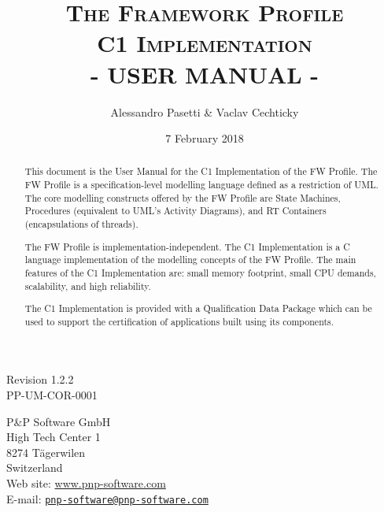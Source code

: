 \documentclass[a4paper,10pt]{article}
\title{\textsc{The Framework Profile} \\ \textsc{C1 Implementation} \\ \textsc{- USER MANUAL -}}
\author{Alessandro Pasetti \& Vaclav Cechticky}
\date{7 February 2018}
\begin{document}
\maketitle

\begin{center}
Revision 1.2.2 \\
PP-UM-COR-0001
\end{center}

\begin{center}
P\&P Software GmbH \\
High Tech Center 1 \\
8274 T\"{a}gerwilen \\
Switzerland \\
\vspace{2mm}
Web site: \url{www.pnp-software.com}\\
E-mail: \href{mailto:pnp-software@pnp-software.com}{\nolinkurl{pnp-software@pnp-software.com}} 
\end{center}

\begin{table}[ht]
\begin{center}
\begin{tabular}{p{11.7cm}}
\\
\hline
\end{tabular}
\end{center}
\end{table}
\begin{abstract}
This document is the User Manual for the C1 Implementation of the FW Profile. The FW Profile is a specification-level modelling language defined as a restriction of UML. The core modelling constructs offered by the FW Profile are State Machines, Procedures (equivalent to UML's Activity Diagrams), and RT Containers (encapsulations of threads).
\par
The FW Profile is implementation-independent. The C1 Implementation is a C language implementation of the modelling concepts of the FW Profile. The main features of the C1 Implementation are: small memory footprint, small CPU demands, scalability, and
high reliability.
\par 
The C1 Implementation is provided with a Qualification Data Package which can be used to support the certification of applications built using its components.
\end{abstract}
\begin{table}[ht]
\begin{center}
\begin{tabular}{p{11.7cm}}
\\
\hline
\end{tabular}
\end{center}
\end{table}
\end{document}
